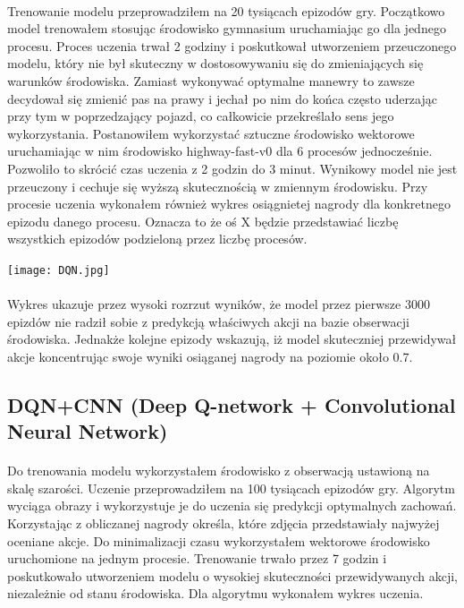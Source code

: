 \documentclass{article}
\begin{document}
\paragraph{}
 Trenowanie modelu przeprowadziłem na 20 tysiącach epizodów gry. Początkowo model trenowałem stosując środowisko gymnasium uruchamiając go dla jednego procesu. Proces uczenia trwał 2 godziny i poskutkował utworzeniem przeuczonego modelu, który nie był skuteczny w dostosowywaniu się do zmieniających się warunków środowiska. Zamiast wykonywać optymalne manewry to zawsze decydował się zmienić pas na prawy i jechał po nim do końca często uderzając przy tym w poprzedzający pojazd, co całkowicie przekreślało sens jego wykorzystania. Postanowiłem wykorzystać sztuczne środowisko wektorowe uruchamiając w nim środowisko highway-fast-v0 dla 6 procesów jednocześnie. Pozwoliło to skrócić czas uczenia z 2 godzin do 3 minut. Wynikowy model nie jest przeuczony i cechuje się wyższą skutecznością w zmiennym środowisku. Przy procesie uczenia wykonałem również wykres osiągnietej nagrody dla konkretnego epizodu danego procesu. Oznacza to że oś X będzie przedstawiać liczbę wszystkich epizodów podzieloną przez liczbę procesów.


\texttt{[image: DQN.jpg]}
\paragraph{}
Wykres ukazuje przez wysoki rozrzut wyników, że model przez pierwsze 3000 epizdów nie radził sobie z predykcją właściwych akcji na bazie obserwacji środowiska. Jednakże kolejne epizody wskazują, iż model skuteczniej przewidywał akcje koncentrując swoje wyniki osiąganej nagrody na poziomie około 0.7.

\newpage

\subsection{DQN+CNN (Deep Q-network + Convolutional Neural Network)}
\paragraph{}
Do trenowania modelu wykorzystałem środowisko z obserwacją ustawioną na skalę szarości. Uczenie przeprowadziłem na 100 tysiącach epizodów gry. Algorytm wyciąga obrazy i wykorzystuje je do uczenia się predykcji optymalnych zachowań. Korzystając z obliczanej nagrody określa, które zdjęcia przedstawiały najwyżej oceniane akcje. Do minimalizacji czasu wykorzystałem wektorowe środowisko uruchomione na jednym procesie. Trenowanie trwało przez 7 godzin i poskutkowało utworzeniem modelu o wysokiej skuteczności przewidywanych akcji, niezależnie od stanu środowiska. Dla algorytmu wykonałem wykres uczenia.
\end{document}
